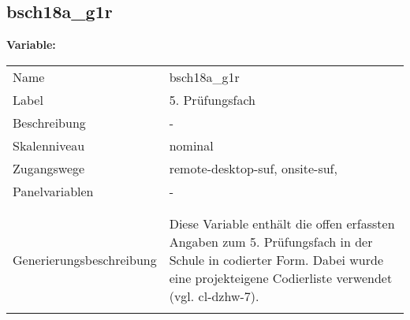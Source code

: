 	
	
	\subsection{bsch18a\_g1r}
	\label{subSection:bsch18a_g1r}

	\noindent\textbf{Variable:}\\
		\begin{tabular}{lL{11.3cm}}
			\label{tableVariable:bsch18a_g1r}
			Name & bsch18a\_g1r \\
			Label & 5. Prüfungsfach  \\
			Beschreibung & - \\
			Skalenniveau & nominal \\
			Zugangswege &
				remote-desktop-suf,
				onsite-suf,
 \\
			Panelvariablen & -
			 \\
			 \\
 \\
					Generierungsbeschreibung & Diese Variable enthält die offen erfassten Angaben zum 5. Prüfungsfach in der Schule in codierter Form. Dabei wurde eine projekteigene Codierliste verwendet (vgl. cl-dzhw-7).
				 \\	
			 \\
		\end{tabular}






